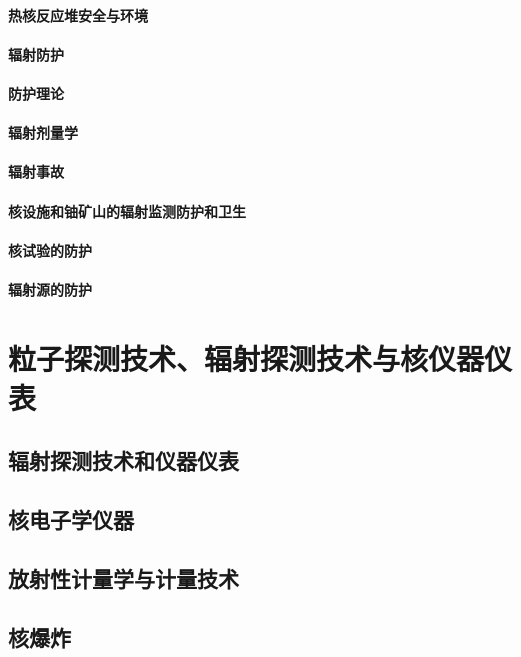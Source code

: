 \documentclass[UTF8]{../../ApplicationUniverse}
\begin{document}
\subsubsection{热核反应堆安全与环境}
\subsubsection{辐射防护}
\subsubsection{防护理论}
\subsubsection{辐射剂量学}
\subsubsection{辐射事故}
\subsubsection{核设施和铀矿山的辐射监测防护和卫生}
\subsubsection{核试验的防护}
\subsubsection{辐射源的防护}








\chapter{粒子探测技术、辐射探测技术与核仪器仪表}
\section{辐射探测技术和仪器仪表}
\section{核电子学仪器}
\section{放射性计量学与计量技术}
\section{核爆炸}
\end{document}
